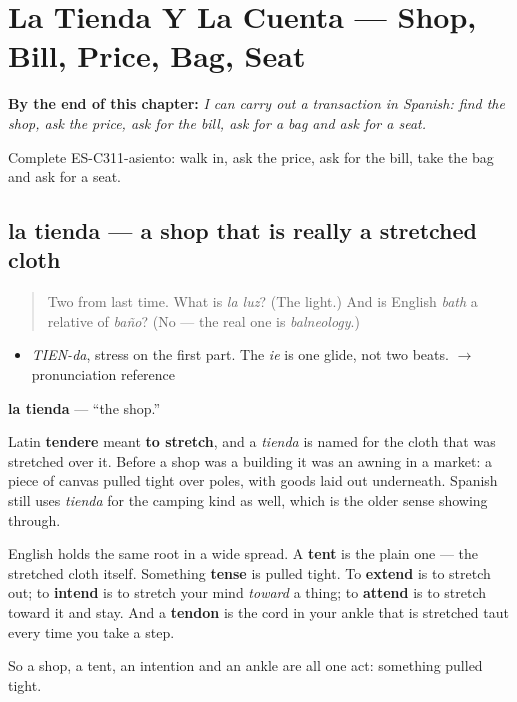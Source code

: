 
\chapter{La Tienda Y La Cuenta --- Shop, Bill, Price, Bag, Seat}
\label{ch:la-tienda-y-la-cuenta}

\begin{chapteropening}
\textbf{By the end of this chapter:} \emph{I can carry out a transaction in Spanish: find the shop, ask the price, ask for the bill, ask for a bag and ask for a seat.}

Complete ES-C311-asiento: walk in, ask the price, ask for the bill, take the bag and ask for a seat.
\end{chapteropening}

\section[la tienda]{la tienda — a shop that is really a stretched cloth}

\label{lesson:ES-C311-tienda}



\begin{quote}
Two from last time. What is \emph{la luz}? (The light.) And is English \emph{bath} a relative of \emph{baño}? (No — the real one is \emph{balneology}.)
\end{quote}

\begin{sounds}
\begin{itemize}
\raggedright
  \item \emph{TIEN-da}, stress on the first part. The \emph{ie} is one glide, not two beats. $\to$ pronunciation reference
\end{itemize}
\end{sounds}

\begin{cousinweb}
\textbf{la tienda} — \textquotedblleft{}the shop.\textquotedblright{}

Latin \textbf{tendere} meant \textbf{to stretch}, and a \emph{tienda} is named for the cloth that was stretched over it. Before a shop was a building it was an awning in a market: a piece of canvas pulled tight over poles, with goods laid out underneath. Spanish still uses \emph{tienda} for the camping kind as well, which is the older sense showing through.

English holds the same root in a wide spread. A \textbf{tent} is the plain one — the stretched cloth itself. Something \textbf{tense} is pulled tight. To \textbf{extend} is to stretch out; to \textbf{intend} is to stretch your mind \emph{toward} a thing; to \textbf{attend} is to stretch toward it and stay. And a \textbf{tendon} is the cord in your ankle that is stretched taut every time you take a step.

So a shop, a tent, an intention and an ankle are all one act: something pulled tight.
\end{cousinweb}

